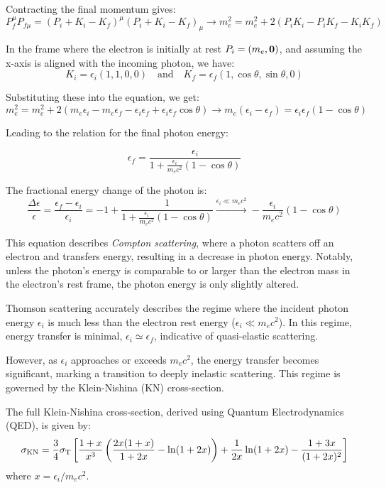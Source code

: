 Contracting the final momentum gives:
%
\[
 P_f^\mu P_{f \mu} = (P_i + K_i - K_f)^\mu (P_i + K_i - K_f)_\mu  \rightarrow m_e^2 = m_e^2 + 2 (P_i K_i - P_i K_f - K_i K_f)
\]

In the frame where the electron is initially at rest \( P_i = \left( m_e, \vb 0 \right) \), and assuming the x-axis is aligned with the incoming photon, we have:
%
\[
K_i = \epsilon_i (1, 1, 0, 0) \quad \text{and} \quad K_f = \epsilon_f (1, \cos \theta, \sin \theta, 0)
\]

Substituting these into the equation, we get:
%
\[
m_e^2 = m_e^2 + 2 \left( m_e \epsilon_i - m_e \epsilon_f - \epsilon_i \epsilon_f + \epsilon_i \epsilon_f \cos \theta \right)
 \rightarrow m_e (\epsilon_i - \epsilon_f) = \epsilon_i \epsilon_f (1-\cos\theta)    
\]

Leading to the relation for the final photon energy:
%
\begin{remark}
\[
\epsilon_f = \frac{\epsilon_i}{1+ \frac{\epsilon_i}{m_e c^2} (1-\cos\theta)}
\]
\end{remark}

The fractional energy change of the photon is:
%
\[
\frac{\Delta \epsilon}{\epsilon}  
= \frac{\epsilon_f - \epsilon_i}{\epsilon_i} = -1 + \frac{1}{1 + \frac{\epsilon_i}{m_e c^2} (1-\cos\theta)} \overset{\epsilon_i \ll m_e c^2}{\longrightarrow} - \frac{\epsilon_i}{m_e c^2} (1-\cos\theta)
\]

This equation describes \emph{Compton scattering}, where a photon scatters off an electron and transfers energy, resulting in a decrease in photon energy. Notably, unless the photon's energy is comparable to or larger than the electron mass in the electron's rest frame, the photon energy is only slightly altered.

Thomson scattering accurately describes the regime where the incident photon energy \( \epsilon_i \) is much less than the electron rest energy (\( \epsilon_i \ll m_e c^2 \)). In this regime, energy transfer is minimal, \( \epsilon_i \simeq \epsilon_f \), indicative of quasi-elastic scattering.

However, as \( \epsilon_i \) approaches or exceeds \( m_e c^2 \), the energy transfer becomes significant, marking a transition to deeply inelastic scattering. This regime is governed by the Klein-Nishina (KN) cross-section.

The full Klein-Nishina cross-section, derived using Quantum Electrodynamics (QED), is given by:
%
\[
\sigma_{\rm KN} = \frac{3}{4} \sigma_{\rm T} \left[ \frac{1+x}{x^3} \left(\frac{2x(1+x)}{1+2x} - \ln (1+2x)\right) + \frac{1}{2x} \ln (1+2x) - \frac{1+3x}{(1+2x)^2} \right]
\]
%
where \( x = \epsilon_i / m_e c^2 \).

